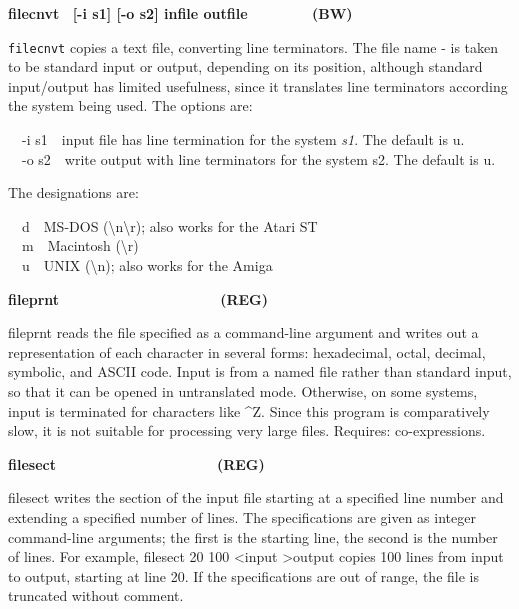 {\sffamily\bfseries
filecnvt \ \textrm{\textmd{[-i s1] [-o s2] infile
outfile\ \ \ \ \ \ \ \  }}(BW)}

\texttt{filecnvt} copies a text file, converting line terminators. The
file name {\textquotedbl}-{\textquotedbl} is taken to be standard input
or output, depending on its position, although standard input/output
has limited usefulness, since it translates line terminators according
the system being used. The options are:

\textsf{\ \ {}-i s1}\ \ input file has line termination for the system
\textsf{\textit{s1}}. The default is
{\textquotedbl}u{\textquotedbl}.\\
\ \ \textsf{{}-o s2}\ \ write output with line terminators for the
system s2. The default is {\textquotedbl}u{\textquotedbl}.

The designations are:

\ \ d\ \ MS-DOS
({\textquotedbl}{\textbackslash}n{\textbackslash}r{\textquotedbl});
also works for the Atari ST\\
\ \ m\ \ Macintosh
({\textquotedbl}{\textbackslash}r{\textquotedbl})\\
\ \ u\ \ UNIX ({\textquotedbl}{\textbackslash}n{\textquotedbl}); also
works for the Amiga

{\sffamily\bfseries
fileprnt\ \ \ \ \ \ \ \ \ \ \ \ \ \ \ \ \ \ \ \ (REG)}

\textsf{fileprnt} reads the file specified as a command-line argument
and writes out a representation of each character in several forms:
hexadecimal, octal, decimal, symbolic, and ASCII code.
Input is from a named file rather than standard input, so that it can
be opened in untranslated mode. Otherwise, on some systems, input is
terminated for characters like \^{}Z. Since this program is
comparatively slow, it is not suitable for processing very large files.
Requires: co-expressions.

{\sffamily\bfseries
filesect\ \ \ \ \ \ \ \ \ \ \ \ \ \ \ \ \ \ \ \ (REG)}

\textsf{filesect} writes the section of the input file starting at a
specified line number and extending a specified number of lines. The
specifications are given as integer command-line arguments; the first
is the starting line, the second is the number of lines. For example,
\textsf{filesect 20 100 {\textless}input {\textgreater}output} copies
100 lines from input to output, starting at line 20. If the
specifications are out of range, the file is truncated without comment.

